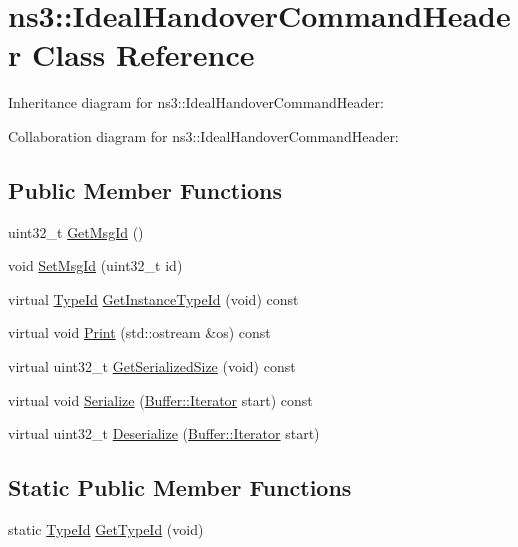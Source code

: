 \hypertarget{classns3_1_1IdealHandoverCommandHeader}{}\section{ns3\+:\+:Ideal\+Handover\+Command\+Header Class Reference}
\label{classns3_1_1IdealHandoverCommandHeader}


Inheritance diagram for ns3\+:\+:Ideal\+Handover\+Command\+Header\+:


Collaboration diagram for ns3\+:\+:Ideal\+Handover\+Command\+Header\+:
\subsection*{Public Member Functions}
\begin{DoxyCompactItemize}
\item 
uint32\+\_\+t \hyperlink{classns3_1_1IdealHandoverCommandHeader_a92182d3c55afda70c4d89f79f443bb97}{Get\+Msg\+Id} ()
\item 
void \hyperlink{classns3_1_1IdealHandoverCommandHeader_a83d2c61747fffb62a3150568262ca59a}{Set\+Msg\+Id} (uint32\+\_\+t id)
\item 
virtual \hyperlink{classns3_1_1TypeId}{Type\+Id} \hyperlink{classns3_1_1IdealHandoverCommandHeader_a4da50ed2715adfe5ec9491061b9a0877}{Get\+Instance\+Type\+Id} (void) const 
\item 
virtual void \hyperlink{classns3_1_1IdealHandoverCommandHeader_ad27b5aabe1cf8de4d06da7e663f5ef00}{Print} (std\+::ostream \&os) const 
\item 
virtual uint32\+\_\+t \hyperlink{classns3_1_1IdealHandoverCommandHeader_ae9d0a6867d04e579fc7bee586d16759d}{Get\+Serialized\+Size} (void) const 
\item 
virtual void \hyperlink{classns3_1_1IdealHandoverCommandHeader_a482ba038c7a3c1d76f2b74af483ca2a1}{Serialize} (\hyperlink{classns3_1_1Buffer_1_1Iterator}{Buffer\+::\+Iterator} start) const 
\item 
virtual uint32\+\_\+t \hyperlink{classns3_1_1IdealHandoverCommandHeader_a5d82964ca56bdcc809ea265051dd7051}{Deserialize} (\hyperlink{classns3_1_1Buffer_1_1Iterator}{Buffer\+::\+Iterator} start)
\end{DoxyCompactItemize}
\subsection*{Static Public Member Functions}
\begin{DoxyCompactItemize}
\item 
static \hyperlink{classns3_1_1TypeId}{Type\+Id} \hyperlink{classns3_1_1IdealHandoverCommandHeader_ae75001e240988ec62dab3f1b2226f061}{Get\+Type\+Id} (void)
\end{DoxyCompactItemize}
